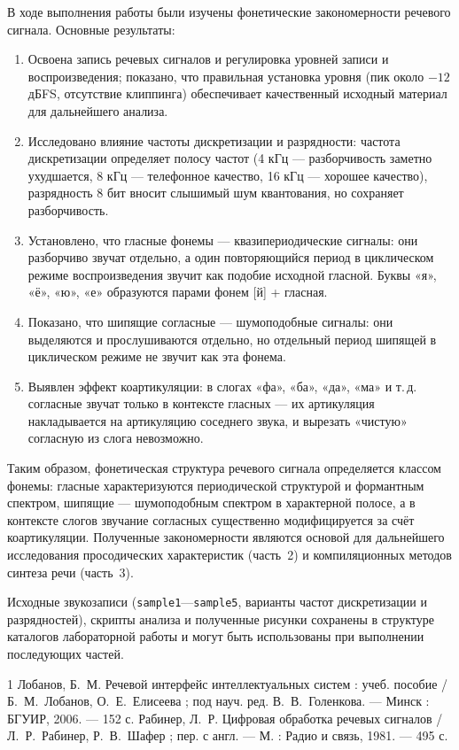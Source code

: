 В ходе выполнения работы были изучены фонетические закономерности
речевого сигнала. Основные результаты:
\begin{enumerate}
	\item Освоена запись речевых сигналов и регулировка уровней записи
		и воспроизведения; показано, что правильная установка уровня
		(пик около $-12$ дБFS, отсутствие клиппинга) обеспечивает
		качественный исходный материал для дальнейшего анализа.
	\item Исследовано влияние частоты дискретизации и разрядности:
		частота дискретизации определяет полосу частот (4 кГц ---
		разборчивость заметно ухудшается, 8 кГц --- телефонное
		качество, 16 кГц --- хорошее качество), разрядность 8 бит
		вносит слышимый шум квантования, но сохраняет разборчивость.
	\item Установлено, что гласные фонемы --- квазипериодические
		сигналы: они разборчиво звучат отдельно, а один
		повторяющийся период в циклическом режиме воспроизведения
		звучит как подобие исходной гласной. Буквы «я», «ё», «ю», «е»
		образуются парами фонем [й] + гласная.
	\item Показано, что шипящие согласные --- шумоподобные сигналы:
		они выделяются и прослушиваются отдельно, но отдельный период
		шипящей в циклическом режиме не звучит как эта фонема.
	\item Выявлен эффект коартикуляции: в слогах «фа», «ба», «да»,
		«ма» и т.\,д. согласные звучат только в контексте гласных ---
		их артикуляция накладывается на артикуляцию соседнего звука,
		и вырезать «чистую» согласную из слога невозможно.
\end{enumerate}

Таким образом, фонетическая структура речевого сигнала определяется
классом фонемы: гласные характеризуются периодической структурой и
формантным спектром, шипящие --- шумоподобным спектром в
характерной полосе, а в контексте слогов звучание согласных
существенно модифицируется за счёт коартикуляции. Полученные
закономерности являются основой для дальнейшего исследования
просодических характеристик (часть~2) и компиляционных методов
синтеза речи (часть~3).

Исходные звукозаписи (\texttt{sample1}---\texttt{sample5},
варианты частот дискретизации и разрядностей), скрипты анализа и
полученные рисунки сохранены в структуре каталогов лабораторной
работы и могут быть использованы при выполнении последующих частей.

\begin{thebibliography}{1}
		Лобанов, Б.~М. Речевой интерфейс интеллектуальных систем :
		учеб. пособие / Б.~М.~Лобанов, О.~Е.~Елисеева ; под науч. ред.
		В.~В.~Голенкова. --- Минск : БГУИР, 2006. --- 152 с.
		Рабинер, Л.~Р. Цифровая обработка речевых сигналов /
		Л.~Р.~Рабинер, Р.~В.~Шафер ; пер. с англ. --- М. : Радио и
		связь, 1981. --- 495 с.
\end{thebibliography}
